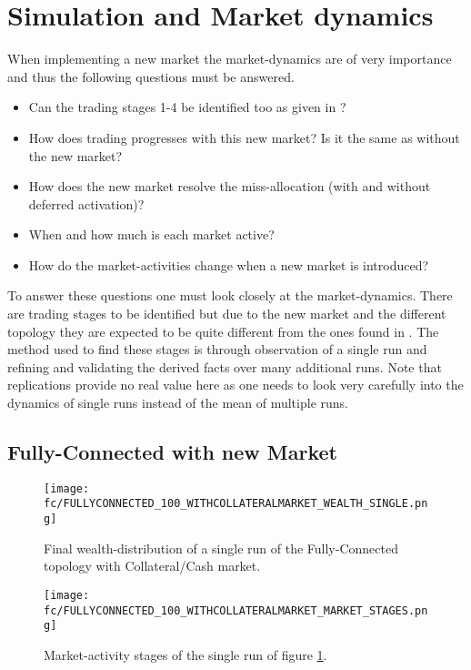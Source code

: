 \documentclass[Bachelorarbeit.tex]{subfiles}
\begin{document}
\section{Simulation and Market dynamics}
When implementing a new market the market-dynamics are of very importance and thus the following questions must be answered.

\begin{itemize}
\item Can the trading stages 1-4 be identified too as given in \cite{Breuer2015}?
\item How does trading progresses with this new market? Is it the same as without the new market?
\item How does the new market resolve the miss-allocation (with and without deferred activation)?
\item When and how much is each market active? 
\item How do the market-activities change when a new market is introduced?
\end{itemize}

To answer these questions one must look closely at the market-dynamics. There are trading stages to be identified but due to the new market and the different topology they are expected to be quite different from the ones found in \cite{Breuer2015}. The method used to find these stages is through observation of a single run and refining and validating the derived facts over many additional runs. Note that replications provide no real value here as one needs to look very carefully into the dynamics of single runs instead of the mean of multiple runs.

\subsection{Fully-Connected with new Market}

\begin{figure}[H]
	\centering
  \texttt{[image: fc/FULLYCONNECTED\_100\_WITHCOLLATERALMARKET\_WEALTH\_SINGLE.png]}
  	\caption{Final wealth-distribution of a single run of the Fully-Connected topology with Collateral/Cash market.}
	\label{fig:wealth_FULLYCONNECTED_100_WITHCOLLATERALMARKET_WEALTH_SINGLE}
\end{figure}

\begin{figure}[H]
	\centering
  \texttt{[image: fc/FULLYCONNECTED\_100\_WITHCOLLATERALMARKET\_MARKET\_STAGES.png]}
  	\caption{Market-activity stages of the single run of figure \ref{fig:wealth_FULLYCONNECTED_100_WITHCOLLATERALMARKET_WEALTH_SINGLE}.}
	\label{fig:markets_FULLYCONNECTED_100_WITHCOLLATERALMARKET_MARKET_STAGES}
\end{figure}
\end{document}

